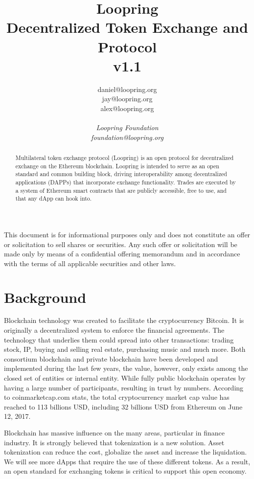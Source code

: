 \documentclass[UTF8,nofonts]{article}
\title{\textbf{Loopring}\\\textbf{Decentralized Token Exchange and Protocol}\\v1.1}
\author{
  daniel@loopring.org\\
  jay@loopring.org\\
  alex@loopring.org\\ 
  \\
  \textit{Loopring Foundation}\\
  \textit{foundation@loopring.org}\\
 }
\begin{document}
\maketitle
This document is for informational purposes only and does not constitute an offer or solicitation to sell shares or securities. Any such offer or solicitation will be made only by means of a confidential offering memorandum and in accordance with the terms of all applicable securities and other laws.



\begin{abstract}
Multilateral token exchange protocol (Loopring) is an open protocol for decentralized exchange on the Ethereum blockchain. Loopring is intended to serve as an open standard and common building block,  driving interoperability among decentralized applications (DAPPs) that incorporate exchange functionality. Trades are executed by a system of Ethereum smart contracts that are publicly accessible,  free to use, and that any dApp can hook into.
\end{abstract}

\newpage

\tableofcontents
\newpage

\section{Background\label{sec: background}}

Blockchain\cite{staff2016blockchains}\cite{swan2015blockchain} technology was created to facilitate the cryptocurrency Bitcoin\cite{nakamoto2008Bitcoin}. It is originally a decentralized system to enforce the financial agreements\cite{lamport1982byzantine}\cite{christidis2016blockchains}. The technology that underlies them could spread into other transactions: trading stock,  IP, buying and selling real estate, purchasing music and much more. Both consortium blockchain and private blockchain have been developed and implemented during the last few years, the value, however, only exists among the closed set of entities or internal entity. While fully public blockchain operates by having a large number of participants,  resulting in trust by numbers. According to coinmarketcap.com stats,  the total cryptocurrency market cap value has reached to 113 billions USD,  including 32 billions USD from Ethereum\cite{wood2014ethereum} on June 12, 2017.

Blockchain has massive influence on the many areas,  particular in finance industry. It is strongly believed that tokenization\cite{liu2016medical}\cite{christidis2016blockchains}\cite{swan2015blockchain} is a new solution. Asset tokenization can reduce the cost,  globalize the asset and increase the liquidation. We will see more dApps that require the use of these different tokens. As a result,  an open standard for exchanging tokens is critical to support this open economy.
\end{document}

